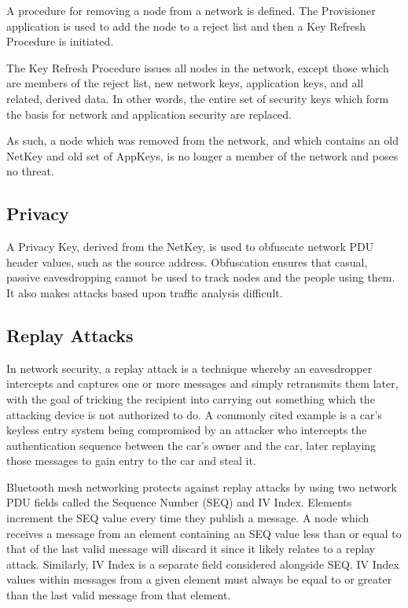 \documentclass[\main/main.tex]{subfiles}
\begin{document}
A procedure for removing a node from a network is defined. The Provisioner application is used to add the node to a reject list and then a Key Refresh Procedure is initiated.

The Key Refresh Procedure issues all nodes in the network, except those which are members of the reject list, new network keys, application keys, and all related, derived data. In other words, the entire set of security keys which form the basis for network and application security are replaced.

As such, a node which was removed from the network, and which contains an old NetKey and old set of AppKeys, is no longer a member of the network and poses no threat.

\subsection{Privacy}
A Privacy Key, derived from the NetKey, is used to obfuscate network PDU header values, such as the source address. Obfuscation ensures that casual, passive eavesdropping cannot be used to track nodes and the people using them. It also makes attacks based upon traffic analysis difficult.

\subsection{Replay Attacks}
In network security, a replay attack is a technique whereby an eavesdropper intercepts and captures one or more messages and simply retransmits them later, with the goal of tricking the recipient into carrying out something which the attacking device is not authorized to do. A commonly cited example is a car’s keyless entry system being compromised by an attacker who intercepts the authentication sequence between the car’s owner and the car, later replaying those messages to gain entry to the car and steal it.

Bluetooth mesh networking protects against replay attacks by using two network PDU fields called the Sequence Number (SEQ) and IV Index. Elements increment the SEQ value every time they publish a message. A node which receives a message from an element containing an SEQ value less than or equal to that of the last valid message will discard it since it likely relates to a replay attack. Similarly, IV Index is a separate field considered alongside SEQ. IV Index values within messages from a given element must always be equal to or greater than the last valid message from that element.
\end{document}
